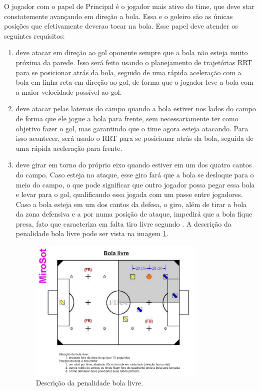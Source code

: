 \documentclass[a4paper,12pt]{article}
\begin{document}
O jogador com o papel de Principal é o jogador mais ativo do time, que deve star constatemente avançando em direção a bola. Essa e o goleiro são as únicas posições que efetivamente deverao tocar na bola. Esse papel deve atender os seguintes requisitos:

\begin{enumerate}
\item deve atacar em direção ao gol oponente sempre que a bola não esteja muito próxima da parede. Isso será feito usando o planejamento de trajetórias RRT para se posicionar atrás da bola, seguido de uma rápida aceleração com a bola em linha reta em direção ao gol, de forma que o jogador leve a bola com a maior velocidade possível ao gol.
\item deve atacar pelas laterais do campo quando a bola estiver nos lados do campo de forma que ele jogue a bola para frente, sem necessariamente ter como objetivo fazer o gol, mas garantindo que o time agora esteja atacando. Para isso acontecer, será usado o RRT para se posicionar atrás da bola, seguida de uma rápida aceleração para frente.
\item deve girar em torno do próprio eixo quando estiver em um dos quatro cantos do campo. Caso esteja no ataque, esse giro fará que a bola se desloque para o meio do campo, o que pode significar que outro jogador possa pegar essa bola e levar para o gol, qualificando essa jogada com um passe entre jogadores. Caso a bola esteja em um dos cantos da defesa, o giro, além de tirar a bola da zona defensiva e a por numa posição de ataque, impedirá que a bola fique presa, fato que caracteriza em falta tiro livre segundo \cite{cbr2008}. A descrição da penalidade bola livre pode ser vista na imagem \ref{fig:bola_livre}.


\begin{figure}[H]
	\centering
	\includegraphics[width=0.8\textwidth]{figures/bola_livre.png}
   \caption{Descrição da penalidade bola livre.} \label{fig:bola_livre}
\end{figure}


\end{enumerate}
\end{document}
